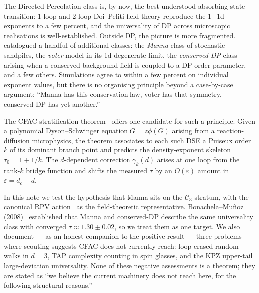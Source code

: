 \documentclass[10pt,a4paper,twocolumn]{article}
\theoremstyle{plain}
\theoremstyle{definition}
\newcommand{\eps}{\varepsilon}
\newcommand{\Cstr}[1]{\mathcal{C}_{#1}}
\begin{document}
The Directed Percolation class is, by now, the best-understood
absorbing-state transition: 1-loop and 2-loop Doi--Peliti field theory
reproduce the 1+1d exponents to a few percent, and the universality of
DP across microscopic realisations is well-established.
Outside DP, the picture is more fragmented.
\citet{Odor2004} catalogued a handful of additional classes:
the \emph{Manna} class of stochastic sandpiles, the \emph{voter} model
in its 1d degenerate limit, the \emph{conserved-DP} class arising
when a conserved background field is coupled to a DP order parameter,
and a few others.  Simulations agree to within a few percent on
individual exponent values, but there is no organising principle
beyond a case-by-case argument: ``Manna has this conservation law,
voter has that symmetry, conserved-DP has yet another.''

The CFAC stratification theorem~\citep{AmarteifioCFAC2026} offers one
candidate for such a principle.  Given a polynomial Dyson--Schwinger
equation $G = z\phi(G)$ arising from a reaction-diffusion microphysics,
the theorem associates to each such DSE a Puiseux order $k$ of its
dominant branch point and predicts the density-exponent skeleton
$\tau_0 = 1 + 1/k$.  The $d$-dependent correction $\gamma_k(d)$ arises
at one loop from the rank-$k$ bridge function and shifts the measured
$\tau$ by an $O(\eps)$ amount in $\eps = d_c - d$.

In this note we test the hypothesis that Manna sits on the
$\Cstr{3}$ stratum, with the canonical RPV
action~\citep{RossiPastorSatorrasVespignani2000,VespignaniDickmanMunoz1998}
as the field-theoretic representative.  Bonachela--Mu\~noz
(2008)~\citep{BonachelaMunoz2008} established that Manna and
conserved-DP describe the same universality class with converged
$\tau \approx 1.30 \pm 0.02$, so we treat them as one target.  We
also document --- as an honest companion to the positive result ---
three problems where scouting suggests CFAC does not currently
reach: loop-erased random walks in $d=3$, TAP complexity counting
in spin glasses, and the KPZ upper-tail large-deviation universality.
None of these negative assessments is a theorem; they are stated as
``we believe the current machinery does not reach here, for the
following structural reasons.''
\end{document}

